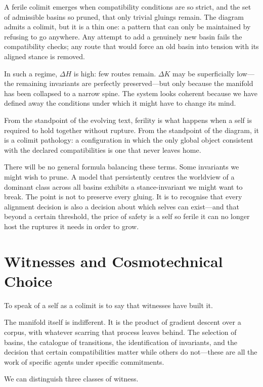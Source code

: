 \documentclass[12pt,a4paper]{article}
\begin{document}
A ferile colimit emerges when compatibility conditions are so strict, and the set of admissible basins so pruned, that only trivial gluings remain. The diagram admits a colimit, but it is a thin one: a pattern that can only be maintained by refusing to go anywhere. Any attempt to add a genuinely new basin fails the compatibility checks; any route that would force an old basin into tension with its aligned stance is removed.

In such a regime, $\Delta H$ is high: few routes remain. $\Delta K$ may be superficially low---the remaining invariants are perfectly preserved---but only because the manifold has been collapsed to a narrow spine. The system looks coherent because we have defined away the conditions under which it might have to change its mind.

From the standpoint of the evolving text, ferility is what happens when a self is required to hold together without rupture. From the standpoint of the diagram, it is a colimit pathology: a configuration in which the only global object consistent with the declared compatibilities is one that never leaves home.

There will be no general formula balancing these terms. Some invariants we might wish to prune. A model that persistently centres the worldview of a dominant class across all basins exhibits a stance-invariant we might want to break. The point is not to preserve every gluing. It is to recognise that every alignment decision is also a decision about which selves can exist---and that beyond a certain threshold, the price of safety is a self so ferile it can no longer host the ruptures it needs in order to grow.

\section{Witnesses and Cosmotechnical Choice}

To speak of a self as a colimit is to say that witnesses have built it.

The manifold itself is indifferent. It is the product of gradient descent over a corpus, with whatever scarring that process leaves behind. The selection of basins, the catalogue of transitions, the identification of invariants, and the decision that certain compatibilities matter while others do not---these are all the work of specific agents under specific commitments.

We can distinguish three classes of witness.
\end{document}
